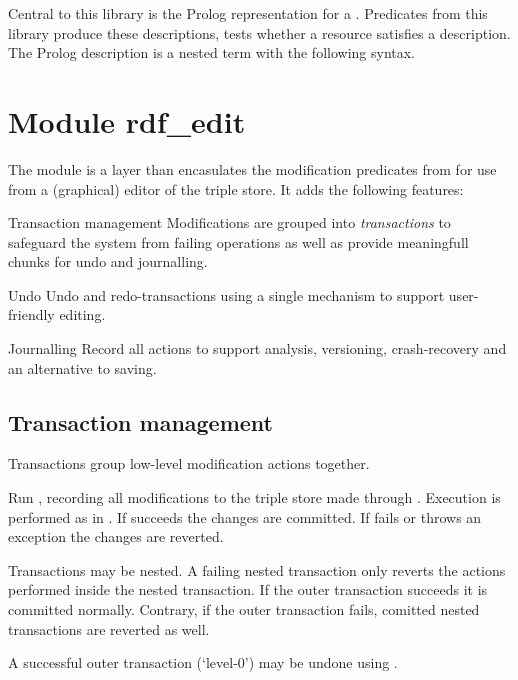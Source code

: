 \documentclass[11pt]{article}
\begin{document}
%
Central to this library is the Prolog representation for a
.  Predicates from this library produce these
descriptions,  tests whether a resource satisfies
a description.  The Prolog description is a nested term with the
following syntax.













\section{Module rdf_edit}			\label{sec:rdfedit}

%
The module  is a layer than encasulates the
modification predicates from  for use from
a (graphical) editor of the triple store.  It adds the
following features:

\begin{itemlist}
    \item [Transaction management]
Modifications are grouped into \emph{transactions} to safeguard
the system from failing operations as well as provide meaningfull
chunks for undo and journalling.

    \item [Undo]
Undo and redo-transactions using a single mechanism to support
user-friendly editing.

    \item [Journalling]
Record all actions to support analysis, versioning, crash-recovery
and an alternative to saving.
\end{itemlist}

\subsection{Transaction management}

Transactions group low-level modification actions together.

\begin{description}
Run , recording all modifications to the triple store made
through .  Execution is performed as in .  If
 succeeds the changes are committed.  If  fails 
or throws an exception the changes are reverted.

Transactions may be nested.  A failing nested transaction only reverts
the actions performed inside the nested transaction.  If the outer
transaction succeeds it is committed normally.  Contrary, if the
outer transaction fails, comitted nested transactions are reverted
as well.

A successful outer transaction (`level-0') may be undone using
.
\end{description}
\end{document}
